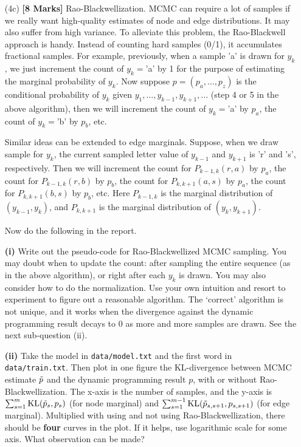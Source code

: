 \documentclass[11pt]{report}
\begin{document}
\begin{itemize}
	{\bf [Observations:]}
	
	Clearly, with MCMC gradients introduced noise, LBFGS had the least effect compared to momentum, and SGD was affected the most. The effect of noise on SGD, and momentum was not trivial. With increase in the value of s (number of samples) the performance of the model increases with reduced noise. We performed the experiment using s = 10. 
	
	
	\item[(4c)] {\bf [8 Marks]} 
	Rao-Blackwellization. 
	MCMC can require a lot of samples if we really want high-quality estimates of node and edge distributions.
	It may also suffer from high variance.
	To alleviate this problem, the Rao-Blackwell approach is handy.
	Instead of counting hard samples (0/1), it accumulates fractional samples.
	For example, previously, when a sample 'a' is drawn for $y_k$, 
	we just increment the count of $y_k = $'a' by 1 for the purpose of estimating the marginal probability of $y_k$.
	Now suppose $p=(p_a, \ldots, p_z)$ is the conditional probability of $y_k$ given $y_1, \ldots, y_{k-1}, y_{k+1}, \ldots$ (step 4 or 5 in the above algorithm), then we will increment the count of $y_k = $'a' by $p_a$,
	the count of $y_k = $'b' by $p_b$, etc.
	
	Similar ideas can be extended to edge marginals.
	Suppose, when we draw sample for $y_k$, 
	the current sampled letter value of $y_{k-1}$ and $y_{k+1}$ is 'r' and 's', respectively.
	Then we will increment the count for $P_{k-1,k}(r, a)$ by $p_a$, 
	the count for $P_{k-1,k}(r, b)$ by $p_b$, 
	the count for $P_{k,k+1}(a, s)$ by $p_a$, 
	the count for $P_{k,k+1}(b, s)$ by $p_b$, 
	etc.
	Here $P_{k-1,k}$ is the marginal distribution of $(y_{k-1}, y_k)$,
	and $P_{k,k+1}$ is the marginal distribution of $(y_k, y_{k+1})$.
	
	Now do the following in the report.
	
	\textbf{(i)}  Write out the pseudo-code for Rao-Blackwellized MCMC sampling.  
	You may doubt when to update the count:
	after sampling the entire sequence (as in the above algorithm),
	or right after each $y_k$ is drawn.
	You may also consider how to do the normalization.
	Use your own intuition and resort to experiment to figure out a reasonable algorithm.
	The `correct' algorithm is not unique, and it works when the divergence against the dynamic programming result decays to 0 as more and more samples are drawn.
	See the next sub-question (ii).
	
	\textbf{(ii)} Take the model in \verb#data/model.txt# and the first word in \verb#data/train.txt#. Then plot in one figure the KL-divergence between MCMC estimate $\tilde{p}$ and the dynamic programming result $p$, with or without Rao-Blackwellization.
	The x-axis is the number of samples,
	and the y-axis is 
	$\sum_{s=1}^m \text{KL}(\tilde{p}_s, p_s)$ (for node marginal) and 
	$\sum_{s=1}^{m-1} \text{KL}(\tilde{p}_{s,s+1}, p_{s,s+1})$ (for edge marginal).
	Multiplied with using and not using Rao-Blackwellization,
	there should be \textbf{four} curves in the plot.
	If it helps, use logarithmic scale for some axis.
	What observation can be made?
\end{itemize}
\end{document}

